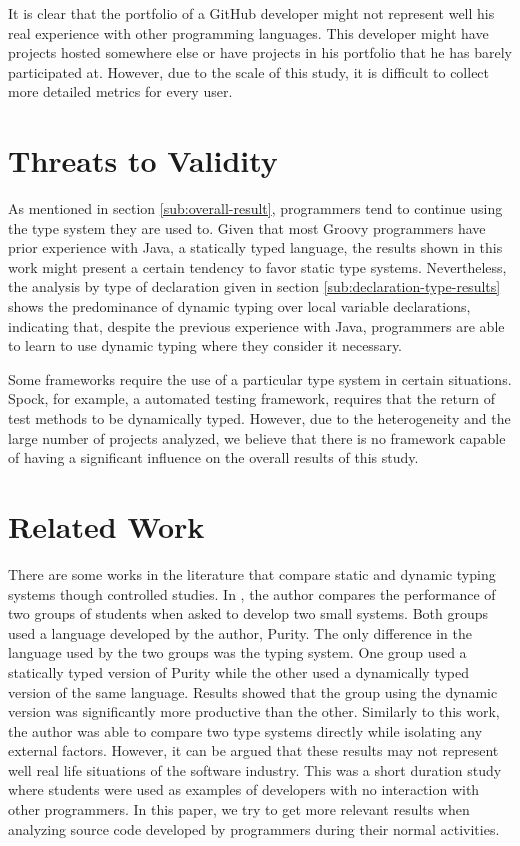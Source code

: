 \documentclass[preprint]{sigplanconf}
\begin{document}
It is clear that the portfolio of a GitHub developer might not represent well his real experience with other programming languages.
This developer might have projects hosted somewhere else or have projects in his portfolio that he has barely participated at.
However, due to the scale of this study, it is difficult to collect more detailed metrics for every user.











%
%
\section{Threats to Validity\label{sec:ameaca}}
As mentioned in section \ref{sub:overall-result}, programmers tend to continue using the type system they are used to.
Given that most Groovy programmers have prior experience with Java, a statically typed language, the results shown in this work might present a certain tendency to favor static type systems. 
Nevertheless, the analysis by type of declaration given in section \ref{sub:declaration-type-results} shows the predominance of dynamic typing over local variable declarations, indicating that, despite the previous experience with Java,
programmers are able to learn to use dynamic typing where they consider it necessary.

Some frameworks require the use of a particular type system in certain situations. 
Spock, for example, a automated testing framework, requires that the return of test methods to be dynamically typed. 
However, due to the heterogeneity and the large number of projects analyzed, we believe that there is no framework capable of having a significant influence on the overall results of this study.

\section{Related Work\label{sec:Trabalhos-Relacionados}}
There are some works in the literature that compare static and dynamic typing systems though controlled studies.
In \cite{experiment_with_purity}, the author compares the performance of two groups of students when asked to develop two small systems. 
Both groups used a language developed by the author, Purity. 
The only difference in the language used by the two groups was the typing system.
One group used a statically typed version of Purity while the other used a dynamically typed version of the same language.
Results showed that the group using the dynamic version was significantly more productive than the other. 
Similarly to this work, the author was able to compare two type systems directly while isolating any external factors. 
However, it can be argued that these results may not represent well real life situations of the software industry. 
This was a short duration study where students were used as examples of developers with no interaction with other programmers. 
In this paper, we try to get more relevant results when analyzing source code developed by programmers during their normal activities.
\end{document}
